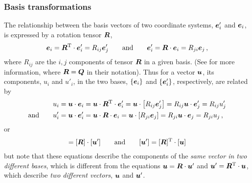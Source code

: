 \documentclass[10pt,letterpaper,oneside]{report}
\newcommand{\ten}[1]{\mbox{\boldmath $#1$}{}}
\newcommand{\scas}[1]{\mbox{{\scriptsize{${\rm{#1}}$}}}{}}
\begin{document}
\subsubsection{Basis transformations}
The relationship between the basis vectors of two coordinate systems, $\ten{e}'_i$ and $\ten{e}_i$, is expressed by a rotation tensor $\ten{R}$, 
\begin{align}
\ten{e}_i = \ten{R}^{\scas{T}} \cdot \ten{e}'_i = R_{ij} \ten{e}'_j   
\qquad \text{and} \qquad  
\ten{e}'_i = \ten{R} \cdot \ten{e}_i = R_{ji} \ten{e}_j \, , 
\end{align}
where $R_{ij}$ are the $i,j$ components of tensor $\ten{R}$ in a given basis.  (See \textcite[Sec.~1.5]{Holzapfel} for more information, where $\ten{R} = \ten{Q}$ in their notation).
Thus for a vector $\ten{u}$, its components, $u_i$ and $u'_i$, in the two bases, $\lbrace \ten{e}_i \rbrace$ and $\lbrace \ten{e}'_i \rbrace$, respectively, are related by
\begin{align}
u_i &= \ten{u} \cdot \ten{e}_i = \ten{u} \cdot \ten{R}^{\scas{T}} \cdot \ten{e}'_i = \ten{u} \cdot \left[ R_{ij} \ten{e}'_j \right] = R_{ij} \ten{u} \cdot \ten{e}'_j = R_{ij} u'_j 
\\ \text{and} \qquad
u'_i &= \ten{u} \cdot \ten{e}'_i = \ten{u} \cdot \ten{R} \cdot \ten{e}_i = \ten{u} \cdot \left[ R_{ji} \ten{e}_j \right] = R_{ji} \ten{u} \cdot \ten{e}_j = R_{ji} u_j \, , 
\end{align}
or
\begin{align}
[ \ten{u} ] = [ \ten{R} ] \cdot [ \ten{u}' ] \qquad \text{and} \qquad  [ \ten{u}' ] = [ \ten{R} ]^{\scas{T}} \cdot [ \ten{u} ]
\end{align}
but note that these equations describe the components of the \emph{same vector in two different bases}, which is different from the equations $\ten{u} = \ten{R} \cdot \ten{u}'$ and $\ten{u}' = \ten{R}^{\scas{T}} \cdot \ten{u}$, which describe \emph{two different vectors}, $\ten{u}$ and $\ten{u}'$. 
\end{document}
